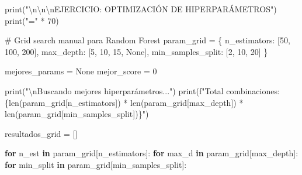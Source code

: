 \documentclass[
  doc,
  floatsintext,
  longtable,
  a4paper,
  nolmodern,
  notxfonts,
  notimes,
  12pt,
  colorlinks=true,linkcolor=blue,citecolor=blue,urlcolor=blue]{apa7}
\newenvironment{Shaded}{\begin{snugshade}}{\end{snugshade}}
\newcommand{\BuiltInTok}[1]{\textcolor[rgb]{0.00,0.23,0.31}{#1}}
\newcommand{\CharTok}[1]{\textcolor[rgb]{0.13,0.47,0.30}{#1}}
\newcommand{\CommentTok}[1]{\textcolor[rgb]{0.37,0.37,0.37}{#1}}
\newcommand{\ControlFlowTok}[1]{\textcolor[rgb]{0.00,0.23,0.31}{\textbf{#1}}}
\newcommand{\DecValTok}[1]{\textcolor[rgb]{0.68,0.00,0.00}{#1}}
\newcommand{\KeywordTok}[1]{\textcolor[rgb]{0.00,0.23,0.31}{\textbf{#1}}}
\newcommand{\NormalTok}[1]{\textcolor[rgb]{0.00,0.23,0.31}{#1}}
\newcommand{\OperatorTok}[1]{\textcolor[rgb]{0.37,0.37,0.37}{#1}}
\newcommand{\SpecialCharTok}[1]{\textcolor[rgb]{0.37,0.37,0.37}{#1}}
\newcommand{\SpecialStringTok}[1]{\textcolor[rgb]{0.13,0.47,0.30}{#1}}
\newcommand{\StringTok}[1]{\textcolor[rgb]{0.13,0.47,0.30}{#1}}
\newcommand{\VariableTok}[1]{\textcolor[rgb]{0.07,0.07,0.07}{#1}}
\begin{document}
\begin{Shaded}
\begin{Highlighting}[]
\BuiltInTok{print}\NormalTok{(}\StringTok{"}\CharTok{\textbackslash{}n\textbackslash{}n\textbackslash{}n}\StringTok{EJERCICIO: OPTIMIZACIÓN DE HIPERPARÁMETROS"}\NormalTok{)}
\BuiltInTok{print}\NormalTok{(}\StringTok{"="} \OperatorTok{*} \DecValTok{70}\NormalTok{)}

\CommentTok{\# Grid search manual para Random Forest}
\NormalTok{param\_grid }\OperatorTok{=}\NormalTok{ \{}
    \StringTok{\textquotesingle{}n\_estimators\textquotesingle{}}\NormalTok{: [}\DecValTok{50}\NormalTok{, }\DecValTok{100}\NormalTok{, }\DecValTok{200}\NormalTok{],}
    \StringTok{\textquotesingle{}max\_depth\textquotesingle{}}\NormalTok{: [}\DecValTok{5}\NormalTok{, }\DecValTok{10}\NormalTok{, }\DecValTok{15}\NormalTok{, }\VariableTok{None}\NormalTok{],}
    \StringTok{\textquotesingle{}min\_samples\_split\textquotesingle{}}\NormalTok{: [}\DecValTok{2}\NormalTok{, }\DecValTok{10}\NormalTok{, }\DecValTok{20}\NormalTok{]}
\NormalTok{\}}

\NormalTok{mejores\_params }\OperatorTok{=} \VariableTok{None}
\NormalTok{mejor\_score }\OperatorTok{=} \DecValTok{0}

\BuiltInTok{print}\NormalTok{(}\StringTok{"}\CharTok{\textbackslash{}n}\StringTok{Buscando mejores hiperparámetros..."}\NormalTok{)}
\BuiltInTok{print}\NormalTok{(}\SpecialStringTok{f"Total combinaciones: }\SpecialCharTok{\{}\BuiltInTok{len}\NormalTok{(param\_grid[}\StringTok{\textquotesingle{}n\_estimators\textquotesingle{}}\NormalTok{]) }\OperatorTok{*} \BuiltInTok{len}\NormalTok{(param\_grid[}\StringTok{\textquotesingle{}max\_depth\textquotesingle{}}\NormalTok{]) }\OperatorTok{*} \BuiltInTok{len}\NormalTok{(param\_grid[}\StringTok{\textquotesingle{}min\_samples\_split\textquotesingle{}}\NormalTok{])}\SpecialCharTok{\}}\SpecialStringTok{"}\NormalTok{)}

\NormalTok{resultados\_grid }\OperatorTok{=}\NormalTok{ []}

\ControlFlowTok{for}\NormalTok{ n\_est }\KeywordTok{in}\NormalTok{ param\_grid[}\StringTok{\textquotesingle{}n\_estimators\textquotesingle{}}\NormalTok{]:}
    \ControlFlowTok{for}\NormalTok{ max\_d }\KeywordTok{in}\NormalTok{ param\_grid[}\StringTok{\textquotesingle{}max\_depth\textquotesingle{}}\NormalTok{]:}
        \ControlFlowTok{for}\NormalTok{ min\_split }\KeywordTok{in}\NormalTok{ param\_grid[}\StringTok{\textquotesingle{}min\_samples\_split\textquotesingle{}}\NormalTok{]:}
            

\end{Highlighting}
\end{Shaded}
\end{document}
